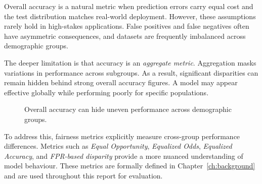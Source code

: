 Overall accuracy is a natural metric when prediction errors carry equal
cost and the test distribution matches real-world deployment. However,
these assumptions rarely hold in high-stakes applications. False positives
and false negatives often have asymmetric consequences, and datasets are
frequently imbalanced across demographic groups.

The deeper limitation is that accuracy is an \emph{aggregate metric}.
Aggregation masks variations in performance across subgroups. As a result,
significant disparities can remain hidden behind strong overall accuracy
figures. A model may appear effective globally while performing poorly
for specific populations.


\begin{figure}[h]
\centering
{}
\caption{Overall accuracy can hide uneven performance across demographic groups.}
\label{fig:accuracy_bias}
\end{figure}


To address this, fairness metrics explicitly measure cross-group
performance differences. Metrics such as \emph{Equal Opportunity},
\emph{Equalized Odds}, \emph{Equalized Accuracy}, and \emph{FPR-based
disparity} provide a more nuanced understanding of model behaviour.
These metrics are formally defined in Chapter~\ref{ch:background} and
are used throughout this report for evaluation.

